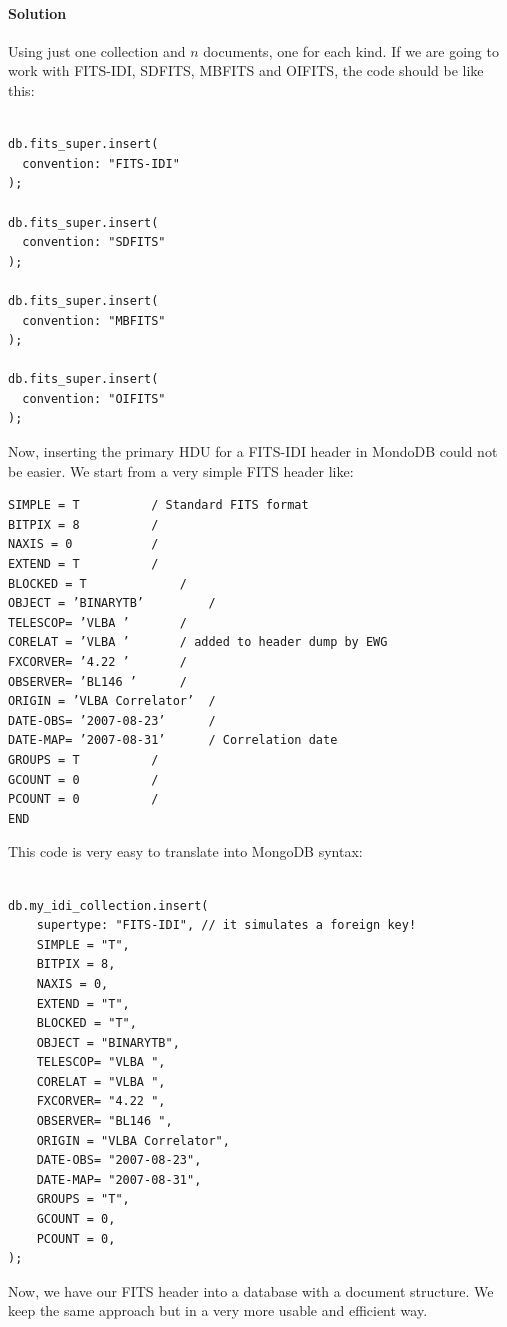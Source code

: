 \paragraph{Solution}

Using just one collection and $n$ documents, one for each kind. If we are going to work with FITS-IDI, SDFITS, MBFITS and OIFITS, the code should be like this:

\begin{lstlisting}

db.fits_super.insert(
  convention: "FITS-IDI"
);

db.fits_super.insert(
  convention: "SDFITS"
);

db.fits_super.insert(
  convention: "MBFITS"
);

db.fits_super.insert(
  convention: "OIFITS"
);

\end{lstlisting}




Now, inserting the primary HDU for a  FITS-IDI header in MondoDB could not be easier. We start from a very simple FITS header like: 
\begin{verbatim}
SIMPLE = T 			/ Standard FITS format
BITPIX = 8 			/
NAXIS = 0 			/
EXTEND = T 			/
BLOCKED = T 			/
OBJECT = ’BINARYTB’ 		/
TELESCOP= ’VLBA ’ 		/
CORELAT = ’VLBA ’ 		/ added to header dump by EWG
FXCORVER= ’4.22 ’ 		/
OBSERVER= ’BL146 ’ 		/
ORIGIN = ’VLBA Correlator’ 	/
DATE-OBS= ’2007-08-23’ 		/
DATE-MAP= ’2007-08-31’ 		/ Correlation date
GROUPS = T 			/
GCOUNT = 0 			/
PCOUNT = 0 			/
END
\end{verbatim}

This code is very easy to translate into MongoDB syntax: 

\begin{lstlisting}

db.my_idi_collection.insert(
    supertype: "FITS-IDI", // it simulates a foreign key!
    SIMPLE = "T",
    BITPIX = 8,
    NAXIS = 0,
    EXTEND = "T",
    BLOCKED = "T",
    OBJECT = "BINARYTB",
    TELESCOP= "VLBA ",
    CORELAT = "VLBA ",
    FXCORVER= "4.22 ",
    OBSERVER= "BL146 ",
    ORIGIN = "VLBA Correlator",
    DATE-OBS= "2007-08-23",
    DATE-MAP= "2007-08-31",
    GROUPS = "T",
    GCOUNT = 0,
    PCOUNT = 0,
);

\end{lstlisting}

Now, we have our FITS header into a database with a document structure. We keep the same approach but in a very more usable and efficient way.



